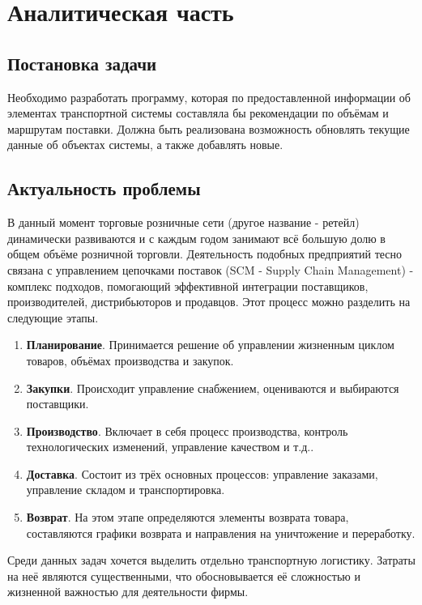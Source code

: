 \section{Аналитическая часть}

\subsection{Постановка задачи}
	Необходимо разработать программу, которая по предоставленной информации об элементах транспортной системы составляла бы рекомендации по объёмам и маршрутам поставки.
	Должна быть реализована возможность обновлять текущие данные об объектах системы, а также добавлять новые.

\subsection{Актуальность проблемы}
	В данный момент торговые розничные сети (другое название - ретейл) динамически развиваются и с каждым годом занимают всё большую долю в общем объёме розничной торговли\cite{subj:demand}. Деятельность подобных предприятий тесно связана с управлением цепочками поставок (SCM - Supply Chain Management) - комплекс подходов, помогающий эффективной интеграции поставщиков, производителей, дистрибьюторов
	и продавцов. Этот процесс можно разделить на следующие этапы\cite{subj:scm}. 
	\begin{enumerate}
		\item \textbf{Планирование}. Принимается решение об управлении жизненным циклом товаров, объёмах производства и закупок.
		\item \textbf{Закупки}. Происходит управление снабжением, оцениваются и выбираются поставщики.
		\item \textbf{Производство}. Включает в себя процесс производства, контроль технологических изменений, управление качеством и т.д..
		\item \textbf{Доставка}. Состоит из трёх основных процессов: управление заказами, управление складом и транспортировка.
		\item \textbf{Возврат}. На этом этапе определяются элементы возврата товара, составляются графики возврата и направления на уничтожение и переработку.
	\end{enumerate}
	
	Среди данных задач хочется выделить отдельно транспортную логистику. Затраты на неё являются существенными, что обосновывается её сложностью и жизненной важностью для деятельности фирмы. 
	
